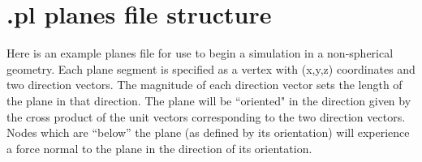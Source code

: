\documentclass[12pt]{article}
\begin{document}
\section{.pl planes file structure}
\label{sec:planefile}
Here is an example planes file for use to begin a simulation in a non-spherical geometry. Each plane segment is specified as a vertex with (x,y,z) coordinates and two direction vectors. The magnitude of each direction vector sets the length of the plane in that direction. The plane will be ``oriented" in the direction given by the cross product of the unit vectors corresponding to the two direction vectors. Nodes which are ``below'' the plane (as defined by its orientation) will experience a force normal to the plane in the direction of its orientation.
\end{document}
